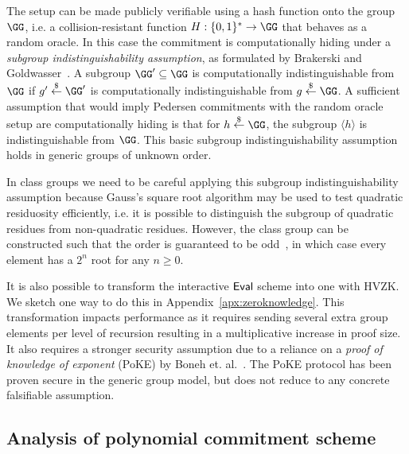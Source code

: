 \documentclass{article}
\theoremstyle{definition}
\begin{document}
The setup can be made publicly verifiable using a hash function onto the group $\GG$, i.e. a collision-resistant function $H: \{0,1\}^* \rightarrow \GG$ that behaves as a random oracle. In this case the commitment is computationally hiding under a \emph{subgroup indistinguishability assumption}, as formulated by Brakerski and Goldwasser~\cite{C:BraGol10}. A subgroup $\GG' \subseteq \GG$ is computationally indistinguishable from $\GG$ if $g' \sample \GG'$ is computationally indistinguishable from $g \sample \GG$. A sufficient assumption that would imply Pedersen commitments with the random oracle setup are computationally hiding is that for $h \sample \GG$, the subgroup $\langle h \rangle$ is indistinguishable from $\GG$. This basic subgroup indistinguishability assumption holds in generic groups of unknown order. 

In class groups we need to be careful applying this subgroup indistinguishability assumption because Gauss's square root algorithm may be used to test quadratic residuosity efficiently, i.e. it is possible to distinguish the subgroup of quadratic residues from non-quadratic residues. However, the class group can be constructed such that the order is guaranteed to be odd~\cite{PKC/BucHam01}, in which case every element has a $2^n$ root for any $n \geq 0$.%

It is also possible to transform the interactive $\textsf{{Eval}}$ scheme into one with HVZK. We sketch one way to do this in Appendix~\ref{apx:zeroknowledge}. This transformation impacts performance as it requires sending several extra group elements per level of recursion resulting in a multiplicative increase in proof size. It also requires a stronger security assumption due to a reliance on a \emph{proof of knowledge of exponent} (PoKE) by Boneh et. al.~\cite{C:BonBunFis19}. The PoKE protocol has been proven secure in the generic group model, but does not reduce to any concrete falsifiable assumption. 


\subsection{Analysis of polynomial commitment scheme} 
\end{document}
